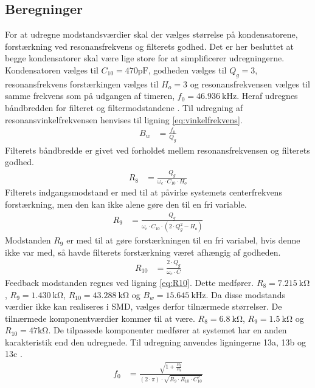 \subsection{Beregninger}
For at udregne modstandsværdier skal der vælges størrelse på kondensatorene, forstærkning ved resonansfrekvens og filterets godhed.
Det er her besluttet at begge kondensatorer skal være lige store for at simplificerer udregningerne.
Kondensatoren vælges til $C_{10} = 470 \si{\pico\farad}$, godheden vælges til $Q_g = 3$, resonansfrekvens forstærkingen vælges til $H_o = 3$ og resonansfrekvensen vælges til samme frekvens som på udgangen af timeren, $f_0 = \SI{46.936}{\kilo\hertz}$.
Heraf udregnes båndbredden for filteret og filtermodstandene \cite[Side. 209]{Huelsman1993}.
Til udregning af resonansvinkelfrekvensen henvises til ligning \ref{eq:vinkelfrekvens}.
\begin{align}
	B_w & = \frac{f_0}{Q_g}
	\end{align}
Filterets båndbredde er givet ved forholdet mellem resonansfrekvensen og filterets godhed.
\begin{align}
	R_8 & = \frac{Q_g}{\omega_c \cdot C_{10} \cdot H_o } \label{eq:R8}
	\end{align}
Filterets indgangsmodstand er med til at påvirke systemets centerfrekvens forstærkning, men den kan ikke alene gøre den til en fri variable. 
\begin{align}
	R_9 & = \frac{Q_g}{ \omega_c \cdot C_{10} \cdot \left( 2 \cdot Q_g^2 - H_o \right) } \label{eq:R9}
	\end{align}
Modstanden $R_9$ er med til at gøre forstærkningen til en fri variabel, hvis denne ikke var med, så havde filterets forstærkning været afhængig af godheden.
\begin{align}
	R_{10} & = \frac{2 \cdot Q_g}{ \omega_c \cdot C} \label{eq:R10}
\end{align}
Feedback modstanden regnes ved ligning \ref{eq:R10}.
Dette medfører. $R_8 = \SI{7.215}{\kilo\ohm}$, $R_9 = \SI{1.430}{\kilo\ohm}$, $R_{10} = \SI{43.288}{\kilo\ohm}$ og $B_w = \SI{15.645}{\kilo\hertz}$.
Da disse modstands værdier ikke kan realiseres i SMD, vælges derfor tilnærmede størrelser.
De tilnærmede komponentværdier kommer til at være. $R_8 = \SI{6.8}{\kilo\ohm}$, $R_9 = \SI{1.5}{\kilo\ohm}$ og $R_{10} = 47 \si{\kilo\ohm}$.
De tilpassede komponenter medfører at systemet har en anden karakteristik end den udregnede. 
Til udregning anvendes ligningerne 13a, 13b og 13c \cite[Side. 208]{Huelsman1993}. 
\begin{align}
	f_0 & = \frac{\sqrt{1+\frac{R_9}{R_8}}}{\left( 2 \cdot \pi \right) \cdot \sqrt{R_9 \cdot R_{10} \cdot C_{10}^2}}
	\end{align}
